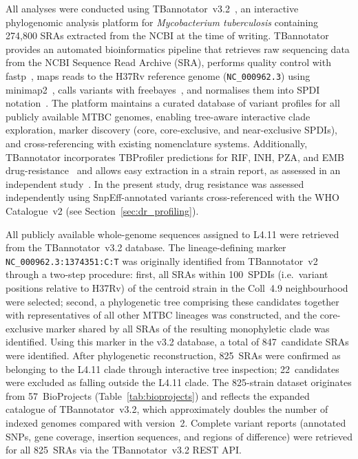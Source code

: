 \documentclass[11pt,a4paper]{article}
\newcommand{\mtb}{\textit{Mycobacterium tuberculosis}}
\newcommand{\spdi}[1]{\texttt{#1}}
\newcommand{\lignee}[1]{\textsf{#1}}
\begin{document}
All analyses were conducted using TBannotator~v3.2~\cite{guyeux2024tbannotator,senelle2023},
an interactive phylogenomic analysis platform for \mtb{} containing 274,800 SRAs extracted from the NCBI at the time of writing.
TBannotator provides an automated bioinformatics pipeline that retrieves
raw sequencing data from the NCBI Sequence Read Archive (SRA), performs
quality control with fastp~\cite{chen2018}, maps reads to the H37Rv reference genome
(\spdi{NC\_000962.3}) using minimap2~\cite{li2018}, calls variants with freebayes~\cite{garrison2012}, and
normalises them into SPDI notation~\cite{holmes2020}.
The platform maintains a curated database of variant profiles for all
publicly available MTBC genomes, enabling tree-aware interactive clade
exploration, marker discovery (core, core-exclusive, and near-exclusive
SPDIs), and cross-referencing with existing nomenclature systems.
Additionally, TBannotator incorporates TBProfiler predictions for RIF, INH, PZA, and EMB drug-resistance~\cite{phelan2019} and allows easy extraction in a strain report, as assessed in an independent study~\cite{auganova2025}.  In the present study, drug resistance was assessed independently using SnpEff-annotated variants cross-referenced with the WHO Catalogue~v2 (see Section~\ref{sec:dr_profiling}).

All publicly available whole-genome sequences assigned to \lignee{L4.11} were
retrieved from the TBannotator~v3.2 database.
The lineage-defining marker \spdi{NC\_000962.3:1374351:C:T} was originally
identified from TBannotator~v2 through a two-step procedure: first, all
SRAs within 100~SPDIs (i.e.\ variant positions relative to H37Rv)
of the centroid strain in the Coll~4.9
neighbourhood were selected; second, a phylogenetic tree comprising these candidates together
with representatives of all other MTBC lineages was constructed, and the
core-exclusive marker shared by all SRAs of the resulting monophyletic
clade was identified.
Using this marker in the v3.2 database, a total of 847~candidate SRAs
were identified.
After phylogenetic reconstruction, 825~SRAs were confirmed as belonging to
the \lignee{L4.11} clade through interactive tree inspection; 22~candidates were
excluded as falling outside the \lignee{L4.11} clade.
The 825-strain dataset originates from 57~BioProjects
(Table~\ref{tab:bioprojects}) and reflects the expanded catalogue of TBannotator~v3.2,
which approximately doubles the number of indexed genomes compared with
version~2.  Complete variant reports (annotated SNPs, gene coverage,
insertion sequences, and regions of difference) were retrieved for
all 825~SRAs via the TBannotator~v3.2 REST API.
\end{document}
